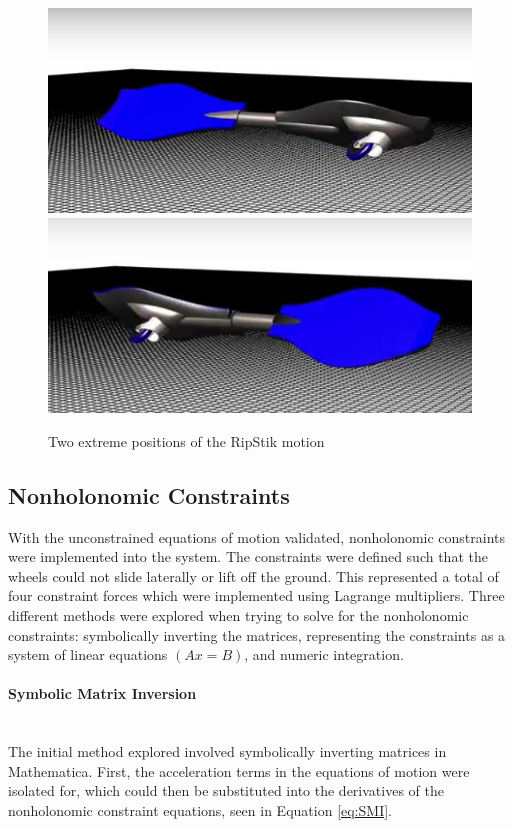 \begin{figure}[!htb]
	\centering
	\includegraphics[width=\linewidth]{oneswing}
	\endminipage\hspace{1em}%
	\includegraphics[width=\linewidth]{twoswing}
	\endminipage
	\caption{Two extreme positions of the RipStik motion}
	\label{fig:RipStikModel1}
\end{figure}

\subsection{Nonholonomic Constraints}

With the unconstrained equations of motion validated, nonholonomic constraints were implemented into the system. 
The constraints were defined such that the wheels could not slide laterally or lift off the ground. 
This represented a total of four constraint forces which were implemented using Lagrange multipliers.
Three different methods were explored when trying to solve for the nonholonomic constraints: symbolically inverting the matrices, representing the constraints as a system of linear equations $(Ax=B)$, and numeric integration.

\paragraph{Symbolic Matrix Inversion}\mbox{}\\
The initial method explored involved symbolically inverting matrices in Mathematica. First, the acceleration terms in the equations of motion were isolated for, which could then be substituted into the derivatives of the nonholonomic constraint equations, seen in Equation \ref{eq:SMI}.

